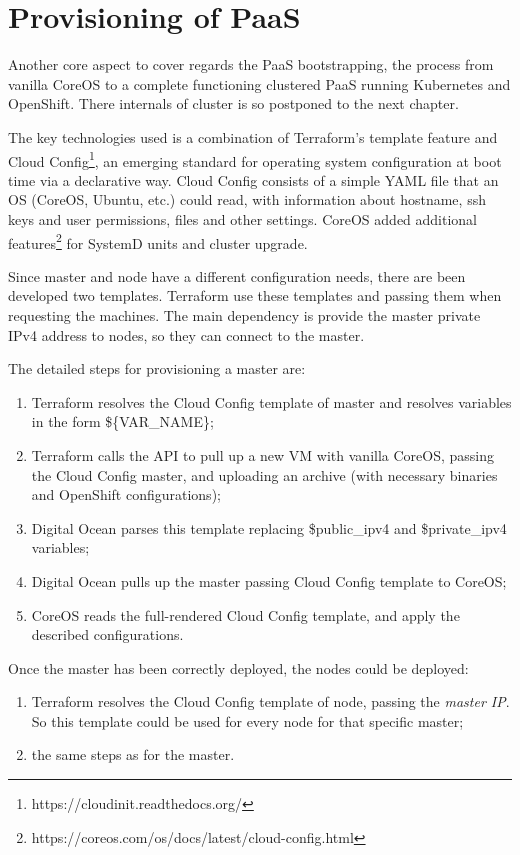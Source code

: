 \section{Provisioning of PaaS}\label{provisioning-of-paas}

Another core aspect to cover regards the PaaS bootstrapping, the process from vanilla CoreOS to a complete functioning clustered PaaS running Kubernetes and OpenShift.  There internals of cluster is so postponed to the next chapter.

The key technologies used is a combination of Terraform's template feature and Cloud Config\footnote{https://cloudinit.readthedocs.org/}, an emerging standard for operating system configuration at boot time via a declarative way.  Cloud Config consists of a simple YAML file that an OS (CoreOS, Ubuntu, etc.) could read, with information about hostname, ssh keys and user permissions, files and other settings.  CoreOS added additional features\footnote{https://coreos.com/os/docs/latest/cloud-config.html} for SystemD units and cluster upgrade.

Since master and node have a different configuration needs, there are been developed two templates.  Terraform use these templates and passing them when requesting the machines. The main dependency is provide the master private IPv4 address to nodes, so they can connect to the master.

The detailed steps for provisioning a master are:
\begin{enumerate}
\item Terraform resolves the Cloud Config template of master and resolves variables in the form \$\{VAR\_NAME\};
\item Terraform calls the API to pull up a new VM with vanilla CoreOS, passing the Cloud Config master, and uploading an archive (with necessary binaries and OpenShift configurations);
\item Digital Ocean parses this template replacing \$public\_ipv4 and \$private\_ipv4 variables;
\item Digital Ocean pulls up the master passing Cloud Config template to CoreOS;
\item CoreOS reads the full-rendered Cloud Config template, and apply the described configurations.
\end{enumerate}

Once the master has been correctly deployed, the nodes could be deployed:
\begin{enumerate}
\item Terraform resolves the Cloud Config template of node, passing the \textit{master IP}.  So this template could be used for every node for that specific master;
\item the same steps as for the master.
\end{enumerate}

